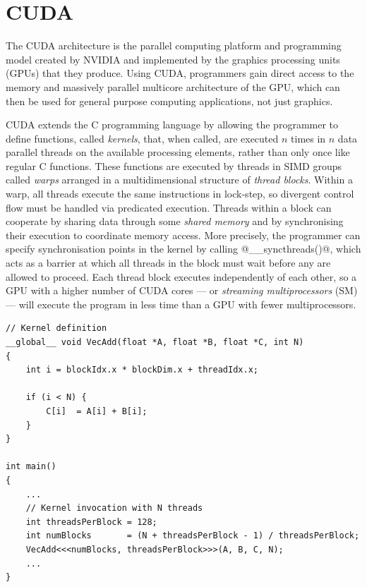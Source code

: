 \section{CUDA}
\label{sec:cuda}

The CUDA\cuda{} architecture is the parallel computing platform and
programming model created by NVIDIA and implemented by the graphics processing
units (GPUs\gpu) that they produce. Using CUDA, programmers gain direct access
to the memory and massively parallel multicore architecture of the GPU, which
can then be used for general purpose computing applications, not just graphics.

CUDA\cuda{} extends the C programming language by allowing the programmer to define
functions, called \emph{kernels}\cuda[kernel]{}, that, when called, are
executed $n$ times in $n$ data parallel threads on the available processing
elements, rather than only once like regular C functions. These functions are
executed by threads in SIMD groups called \emph{warps}\cuda[warp]{} arranged in
a multidimensional structure of \emph{thread blocks}.
Within a warp, all threads execute the same instructions in lock-step, so
divergent control flow must be handled via predicated execution.
Threads within a block can cooperate by sharing data through some \emph{shared
memory} and by synchronising their execution to coordinate
memory access. More precisely, the programmer can specify synchronisation points
in the kernel by calling @__syncthreads()@, which
acts as a barrier at which all threads in the block must wait before any are
allowed to proceed. Each thread block executes independently of each other, so a
GPU with a higher number of CUDA cores --- or \emph{streaming
multiprocessors} (SM) --- will execute the
program in less time than a GPU with fewer multiprocessors.

\begin{lstlisting}[style=cuda_float
    ,label=lst:cuda_vecadd
    ,caption={[CUDA kernel for pair wise addition of two vectors]A CUDA kernel
        that illustrates pair wise addition of two vectors. The
        \code{__global__}\cuda[\code{__global__}]{} keyword marks a function as
        a kernel that should be executed on the GPU in data parallel. The
        execution configuration syntax \code{<<<...>>>} specifies the number of
        threads that will each execute the function in data parallel.}]
// Kernel definition
__global__ void VecAdd(float *A, float *B, float *C, int N)
{
    int i = blockIdx.x * blockDim.x + threadIdx.x;

    if (i < N) {
        C[i]  = A[i] + B[i];
    }
}

int main()
{
    ...
    // Kernel invocation with N threads
    int threadsPerBlock = 128;
    int numBlocks       = (N + threadsPerBlock - 1) / threadsPerBlock;
    VecAdd<<<numBlocks, threadsPerBlock>>>(A, B, C, N);
    ...
}
\end{lstlisting}

